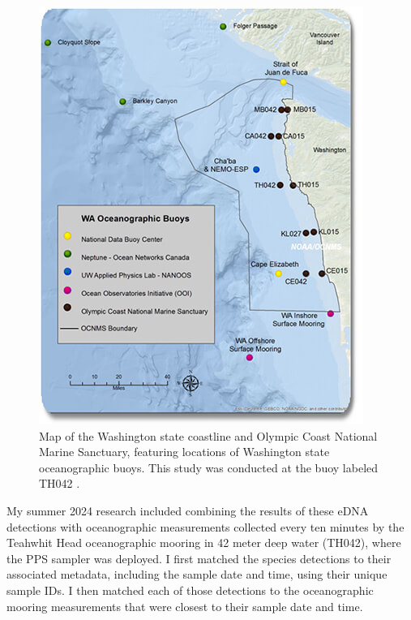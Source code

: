 \documentclass[12pt,twoside]{reedthesis}
\begin{document}
\begin{figure}
	\hspace{1cm}
	\begin{minipage}{0.5\textwidth}
		\centering
		\includegraphics[width=1.0\linewidth]{Fig_OCNMS_buoy_map}
		\caption[Map of oceanographic moorings in OCNMS]{\footnotesize{Map of the Washington state coastline and Olympic Coast National Marine Sanctuary, featuring locations of Washington state oceanographic buoys. This study was conducted at the buoy labeled TH042 }.}
		\label{OCNMSbuoys}
	\end{minipage}
\end{figure}

My summer 2024 research included combining the results of these eDNA detections with oceanographic measurements collected every ten minutes by the Teahwhit Head oceanographic mooring in 42 meter deep water (TH042), where the PPS sampler was deployed. I first matched the species detections to their associated metadata, including the sample date and time, using their unique sample IDs. I then matched each of those detections to the oceanographic mooring measurements that were closest to their sample date and time.  
\end{document}
